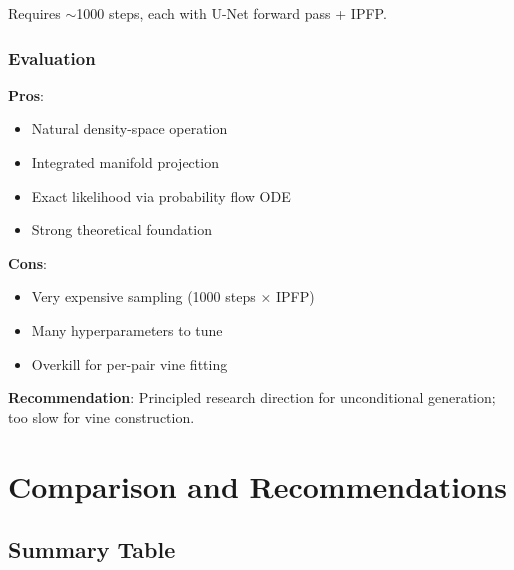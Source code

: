 \documentclass[11pt]{article}
\begin{document}
Requires $\sim$1000 steps, each with U-Net forward pass + IPFP.

\subsubsection{Evaluation}

\textbf{Pros}:
\begin{itemize}
    \item Natural density-space operation
    \item Integrated manifold projection
    \item Exact likelihood via probability flow ODE
    \item Strong theoretical foundation
\end{itemize}

\textbf{Cons}:
\begin{itemize}
    \item Very expensive sampling (1000 steps × IPFP)
    \item Many hyperparameters to tune
    \item Overkill for per-pair vine fitting
\end{itemize}

\textbf{Recommendation}: Principled research direction for unconditional generation; too slow for vine construction.

\section{Comparison and Recommendations}

\subsection{Summary Table}
\end{document}
